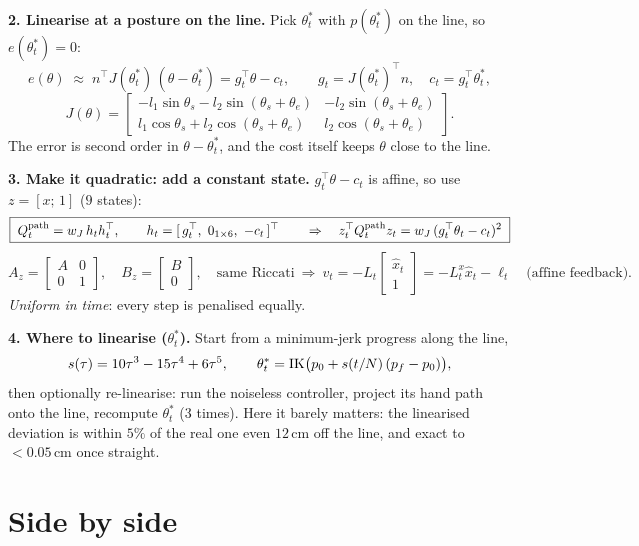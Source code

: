 \documentclass[11pt,a4paper]{article}
\begin{document}
\textbf{2. Linearise at a posture on the line.} Pick $\theta^*_t$ with $p(\theta^*_t)$ on the line,
so $e(\theta^*_t)=0$:
\[
e(\theta)\;\approx\;n^\top J(\theta^*_t)\,(\theta-\theta^*_t)=g_t^\top\theta-c_t,
\qquad g_t=J(\theta^*_t)^\top n,\quad c_t=g_t^\top\theta^*_t,
\]
\[
J(\theta)=\begin{bmatrix}-l_1\sin\theta_s-l_2\sin(\theta_s+\theta_e) & -l_2\sin(\theta_s+\theta_e)\\
l_1\cos\theta_s+l_2\cos(\theta_s+\theta_e) & l_2\cos(\theta_s+\theta_e)\end{bmatrix}.
\]
The error is second order in $\theta-\theta^*_t$, and the cost itself keeps $\theta$ close to the line.

\textbf{3. Make it quadratic: add a constant state.} $g_t^\top\theta-c_t$ is affine, so use
$z=[x;\,1]$ ($9$ states):
\[
\boxed{\;Q^{\rm path}_t=w_J\,h_th_t^\top,\qquad h_t=[\,g_t^\top,\ 0_{1\times6},\ -c_t\,]^\top
\qquad\Rightarrow\quad z_t^\top Q^{\rm path}_tz_t=w_J\,(g_t^\top\theta_t-c_t)^2\;}
\]
\[
A_z=\begin{bmatrix}A&0\\0&1\end{bmatrix},\quad B_z=\begin{bmatrix}B\\0\end{bmatrix},\quad
\text{same Riccati}\ \Rightarrow\ v_t=-L_t\begin{bmatrix}\hat x_t\\1\end{bmatrix}
=-L^x_t\hat x_t-\ell_t\quad\text{(affine feedback)}.
\]
\emph{Uniform in time}: every step is penalised equally.

\textbf{4. Where to linearise ($\theta^*_t$).} Start from a minimum-jerk progress along the line,
\[
s(\tau)=10\tau^3-15\tau^4+6\tau^5,\qquad \theta^*_t={\rm IK}\big(p_0+s(t/N)\,(p_f-p_0)\big),
\]
then optionally re-linearise: run the noiseless controller, project its hand path onto the line,
recompute $\theta^*_t$ (3 times). Here it barely matters: the linearised deviation is within $5\%$
of the real one even $12$\,cm off the line, and exact to $<0.05$\,cm once straight.

\section{Side by side}
\end{document}

